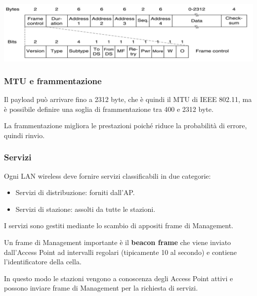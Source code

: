             \begin{center}
                \includegraphics[scale=0.31]{chapters/3/assets/schema_y.png}
            \end{center}

        \subsubsection{MTU e frammentazione}
            Il payload può arrivare fino a 2312 byte, che è quindi il MTU di IEEE 802.11, ma è possibile definire una soglia di frammentazione tra 400 e 2312 byte.
        
            La frammentazione migliora le prestazioni poiché riduce la probabilità di errore, quindi rinvio.

        \subsubsection{Servizi}
            Ogni LAN wireless deve fornire servizi classificabili in due categorie:
            \begin{itemize}
                \item Servizi di distribuzione: forniti dall'AP.
                \item Servizi di stazione: assolti da tutte le stazioni.
            \end{itemize}

            I servizi sono gestiti mediante lo scambio di appositi frame di Management.

            Un frame di Management importante è il \textbf{beacon frame} che viene inviato dall'Access Point ad intervalli regolari (tipicamente 10 al secondo) e contiene l'identificatore della cella.

            In questo modo le stazioni vengono a conoscenza degli Access Point attivi e possono inviare frame di Management per la richiesta di servizi.

